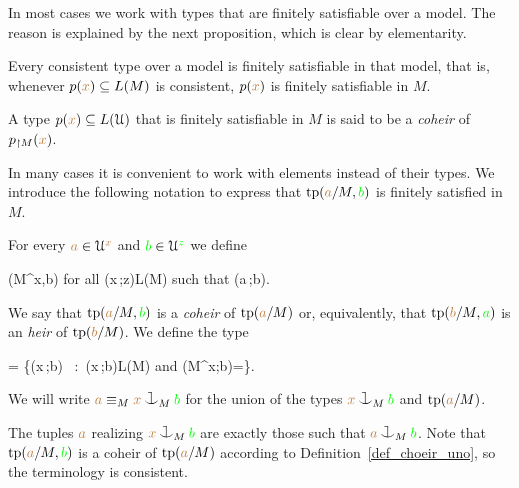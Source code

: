 In most cases we work with types that are finitely satisfiable over a model.
The reason is explained by the next proposition, which is clear by elementarity.

\begin{proposition}\label{prop_coher_over_model}
  Every consistent type over a model is finitely satisfiable in that model, that is, whenever $p({\color{brown} x})\subseteq L(M)$ is consistent, $p({\color{brown} x})$ is finitely satisfiable in $M$.
\end{proposition}

\begin{definition}\label{def_choeir_uno}
  A type $p({\color{brown} x}) \subseteq L(\EuScript U)$ that is finitely satisfiable in $M$ is said to be a \emph{coheir\/} of $p_{\restriction M}({\color{brown} x})$.
\end{definition}

In many cases it is convenient to work with elements instead of their types.
We introduce the following notation to express that ${\rm tp}({\color{brown} a}/M,{\color{green} b})$ is finitely satisfied in $M$.

\begin{definition}\label{def_coheir_idepencence}
  For every ${\color{brown} a}\in\EuScript U^{\color{brown} x}$ and ${\color{green} b}\in\EuScript U^{\color{green} z}$ we define

  \noindent\llap{\textcolor{red}{\Large\warning}\kern1.5ex}
  {\IFF}
  {\phi(M^{\mr x},{\gr b})\neq\0
  \textrm{ for all }\phi({\mr x}\,;{\gr z})\in L(M) 
  \textrm{ such that }\phi({\mr a}\,;{\gr b})}.

  We say that ${\rm tp}({\color{brown} a}/M,{\color{green} b})$ is a \emph{coheir} of ${\rm tp}({\color{brown} a}/M)$ or, equivalently, that ${\rm tp}({\color{brown} b}/M,{\color{green} a})$ is an \emph{heir} of ${\rm tp}({\color{brown} b}/M)$.
  We define the type

  {=}
  {\Big\{\neg\phi({\mr x}\,;{\gr b})
  \ :\ 
  \phi({\mr x}\,;{\gr b})\in L(M)
  \textrm{ and } \phi(M^{\mr x};{\gr b})=\0\Big\}.}

  We will write \emph{${\mr a}\equiv_M{\mr x}\cnonfork_M{\gr b}$} for the union of the types ${\mr x}\cnonfork_M{\gr b}$ and ${\rm tp}({\color{brown} a}/M)$.
\end{definition}

The tuples ${\color{brown} a}$ realizing ${\mr x}\cnonfork_M{\gr b}$ are exactly those such that ${\mr a}\cnonfork_M{\gr b}$.
Note that ${\rm tp}({\color{brown} a}/M,{\color{green} b})$ is a coheir of ${\rm tp}({\color{brown} a}/M)$ according to Definition~\ref{def_choeir_uno}, so the terminology is consistent.

